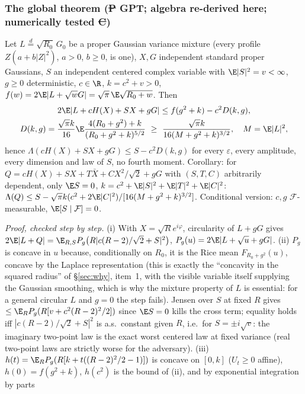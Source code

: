 \subsubsection{The global theorem (\st{P} GPT; algebra re-derived here; numerically tested \st{C})}\label{sec:kfull-global}
\begin{theorem}\label{thm:kfull}
Let $L\overset d=\sqrt{R_0}\,G_0$ be a proper Gaussian variance mixture (every profile $Z(a+b|Z|^2)$, $a>0$, $b\ge0$, is one), $X,G$ independent standard proper Gaussians,
$S$ an independent centered complex variable with $\E|S|^2=v<\infty$, $g\ge0$ deterministic, $c\in\R$, $k=c^2+v>0$, $f(w)=2\E|L+\sqrt wG|=\sqrt\pi\,\E\sqrt{R_0+w}$. Then
\[\begin{gathered}
2\E|L+cH(X)+SX+gG|\le f(g^2+k)-c^2D(k,g),\\
 D(k,g)=\frac{\sqrt\pi k}{16}\E\frac{4(R_0+g^2)+k}{(R_0+g^2+k)^{5/2}}\ \ge\ \frac{\sqrt\pi k}{16(M+g^2+k)^{3/2}},\quad M=\E|L|^2,
\end{gathered}\]
hence $\Lambda(cH(X)+SX+gG)\le S-c^2D(k,g)$ for every $\varepsilon$, every amplitude, every dimension and law of $S$, no fourth moment. Corollary: for
$Q=cH(X)+SX+T\bar X+CX^2/\sqrt2+gG$ with $(S,T,C)$ arbitrarily dependent, only $\E S=0$, $k=c^2+\E|S|^2+\E|T|^2+\E|C|^2$:
$\Lambda(Q)\le S-\sqrt\pi k(c^2+2\E|C|^2)/[16(M+g^2+k)^{3/2}]$. Conditional version: $c,g$ $\mathcal F$-measurable, $\E[S\mid\mathcal F]=0$.
\end{theorem}
\emph{Proof, checked step by step.} (i) With $X=\sqrt Re^{i\varphi}$, circularity of $L+gG$ gives $2\E|L+Q|=\E_{R,S}P_g\bigl(R|c(R-2)/\sqrt2+S|^2\bigr)$, $P_g(u)=2\E|L+\sqrt u+gG|$.
(ii) $P_g$ is concave in $u$ because, conditionally on $R_0$, it is the Rice mean $F_{R_0+g^2}(u)$, concave by the Laplace representation (this is exactly the ``concavity in the squared
radius'' of \S\ref{sec:why}, item~1, with the visible variable itself supplying the Gaussian smoothing, which is why the mixture property of $L$ is essential: for a general circular $L$ and
$g=0$ the step fails). Jensen over $S$ at fixed $R$ gives $\le\E_RP_g(R[v+c^2(R-2)^2/2])$ since $\E S=0$ kills the cross term; equality holds iff $|c(R-2)/\sqrt2+S|^2$ is a.s.\
constant given $R$, i.e.\ for $S=\pm i\sqrt v$: the imaginary two-point law is the exact worst centered law at fixed variance (real two-point laws are strictly worse for the adversary).
(iii) $h(t)=\E_RP_g(R[k+t((R-2)^2/2-1)])$ is concave on $[0,k]$ ($U_t\ge0$ affine), $h(0)=f(g^2+k)$, $h(c^2)$ is the bound of (ii), and by exponential integration by parts
